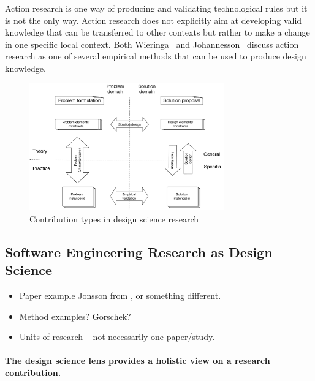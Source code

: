 \documentclass[graybox]{svmult}
\begin{document}
Action research is one way of producing and validating technological rules but it is not the only way. Action research does not explicitly aim at developing valid knowledge that can be transferred to other contexts but rather to make a change in one specific local context. Both Wieringa~\cite{wieringa_technical_2012} and Johannesson~\cite{johannesson_introduction_2014} discuss action research as one of several empirical methods that can be used to produce design knowledge.


\begin{figure}
  \includegraphics[width=0.75\textwidth]{Figures/DS_model.pdf}
\caption{Contribution types in design science research}
\label{fig:contributiontypes}       %
\end{figure}



\subsection{Software Engineering Research as Design Science}
\begin{itemize}
\item Paper example Jonsson \cite{JonssonBug15} from \cite{StoreyESEM17}, or something different.
\item Method examples? Gorschek? \cite{GorschekSW2006}
\item Units of research -- not necessarily one paper/study.
\end{itemize}

\paragraph{The design science lens provides a holistic view on a research contribution.} 
\end{document}
